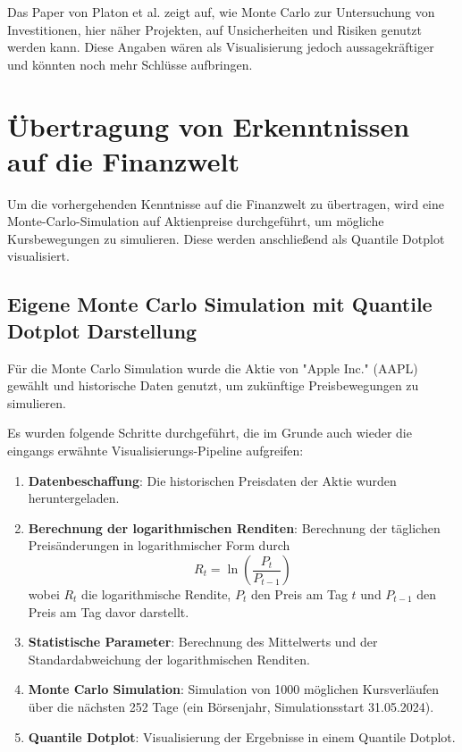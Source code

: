 Das Paper von Platon et al. zeigt auf, wie Monte Carlo zur Untersuchung von Investitionen, hier näher Projekten, auf Unsicherheiten und Risiken genutzt werden kann. Diese Angaben wären als Visualisierung jedoch aussagekräftiger und könnten noch mehr Schlüsse aufbringen.

\section{Übertragung von Erkenntnissen auf die Finanzwelt}

Um die vorhergehenden Kenntnisse auf die Finanzwelt zu übertragen, wird eine Monte-Carlo-Simulation auf Aktienpreise durchgeführt, um mögliche Kursbewegungen zu simulieren. Diese werden anschließend als Quantile Dotplot visualisiert.

\subsection{Eigene Monte Carlo Simulation mit Quantile Dotplot Darstellung}

Für die Monte Carlo Simulation wurde die Aktie von "Apple Inc." (AAPL) gewählt und historische Daten genutzt, um zukünftige Preisbewegungen zu simulieren.

Es wurden folgende Schritte durchgeführt, die im Grunde auch wieder die eingangs erwähnte Visualisierungs-Pipeline aufgreifen:

\begin{enumerate}
    \item \textbf{Datenbeschaffung}: Die historischen Preisdaten der Aktie wurden heruntergeladen.
    \item \textbf{Berechnung der logarithmischen Renditen}: Berechnung der täglichen Preisänderungen in logarithmischer Form durch 
    \[
    R_t = \ln\left(\frac{P_t}{P_{t-1}}\right)
    \]
    wobei \(R_t\) die logarithmische Rendite, \(P_t\) den Preis am Tag \(t\) und \(P_{t-1}\) den Preis am Tag davor darstellt.
    \item \textbf{Statistische Parameter}: Berechnung des Mittelwerts und der Standardabweichung der logarithmischen Renditen.
    \item \textbf{Monte Carlo Simulation}: Simulation von 1000 möglichen Kursverläufen über die nächsten 252 Tage (ein Börsenjahr, Simulationsstart 31.05.2024).
    \item \textbf{Quantile Dotplot}: Visualisierung der Ergebnisse in einem Quantile Dotplot.
\end{enumerate}

